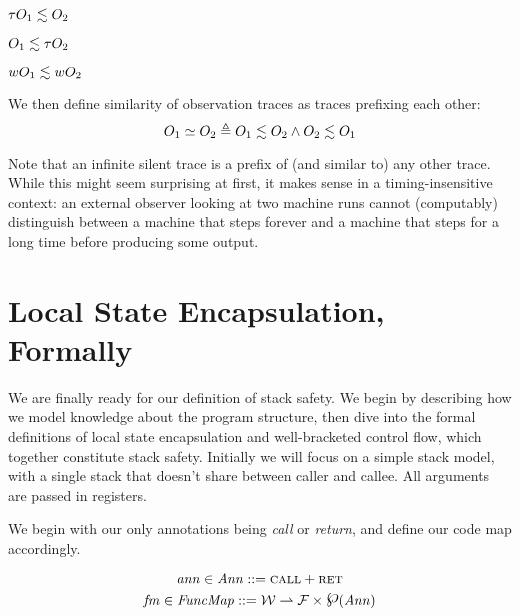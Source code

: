 \documentclass[acmsmall,review,anonymous]{acmart}\settopmatter{printfolios=true,printccs=false,printacmref=false}
\newcommand{\powerset}{\raisebox{.15\baselineskip}{\Large\ensuremath{\wp}}}
\begin{document}
\begin{minipage}{.3\textwidth}
         {\(\tau O_1 \lesssim O_2\)}
\end{minipage}
\begin{minipage}{.3\textwidth}
         {\(O_1 \lesssim \tau O_2\)}
\end{minipage}
\begin{minipage}{.3\textwidth}
         {\(wO_1 \lesssim wO_2\)}
\end{minipage}

\smallskip
We then define similarity of observation traces as traces prefixing each other:
\[O_1 \simeq O_2 \triangleq O_1 \lesssim O_2 \land O_2 \lesssim O_1\]
%

Note that an infinite silent trace is a
prefix of (and similar to) any other trace. While this might seem
surprising at first, it makes sense in a timing-insensitive context:
an external observer looking at two machine runs cannot (computably)
distinguish between a machine that steps forever and a machine that
steps for a long time before producing some output.

\section{Local State Encapsulation, Formally}
\label{sec:lse}

We are finally ready for our definition of stack safety. We begin
by describing how we model knowledge about the program structure,
then dive into the formal definitions of local state encapsulation and
well-bracketed control flow, which together constitute stack safety.
Initially we will focus on a simple stack model, with a single stack
that doesn't share between caller and callee. All arguments are passed
in registers.

We begin with our only annotations being {\em call} or {\em return}, and
define our code map accordingly.

\[\mathit{ann} \in \mathit{Ann} ::= \text{\sc call} + \text{\sc ret}\]
\[\codemap \in \CODEMAPS ::= \WORDS \rightharpoonup \FUNIDS \times \powerset(\ANNS)\]
\end{document}
